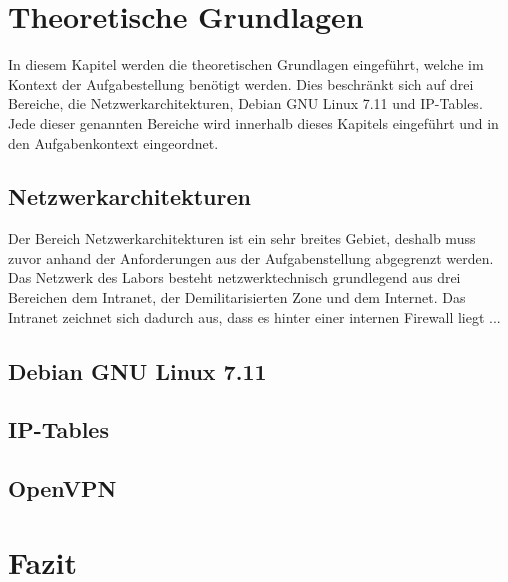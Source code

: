 \documentclass[
a4paper,     %
 headsepline, %
footsepline, %
titlepage,   %
 halfparskip,     %
 fleqn,       %
12pt         %
]{scrartcl}  %
\begin{document}
\section{Theoretische Grundlagen}
In diesem Kapitel werden die theoretischen Grundlagen eingeführt, welche im Kontext der Aufgabestellung benötigt werden. Dies beschränkt sich auf drei Bereiche, die Netzwerkarchitekturen, Debian GNU Linux 7.11 und IP-Tables. Jede dieser genannten Bereiche wird innerhalb dieses Kapitels eingeführt und in den Aufgabenkontext eingeordnet. 
\subsection{Netzwerkarchitekturen}
Der Bereich Netzwerkarchitekturen ist ein sehr breites Gebiet, deshalb muss zuvor anhand der Anforderungen aus der Aufgabenstellung abgegrenzt werden.
Das Netzwerk des Labors besteht netzwerktechnisch grundlegend aus drei Bereichen dem Intranet, der Demilitarisierten Zone und dem Internet. 
Das Intranet zeichnet sich dadurch aus, dass es hinter einer internen Firewall liegt ... 

\subsection{Debian GNU Linux 7.11}
\subsection{IP-Tables}\label{iptables}
\subsection{OpenVPN}


\section{Fazit}



 \appendix  %

 

 
\end{document}
